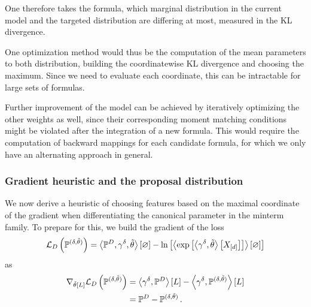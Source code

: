 

One therefore takes the formula, which marginal distribution in the current model and the targeted distribution are differing at most, measured in the KL divergence.

One optimization method would thus be the computation of the mean parameters to both distribution, building the coordinatewise KL divergence and choosing the maximum. 
Since we need to evaluate each coordinate, this can be intractable for large sets of formulas.


Further improvement of the model can be achieved by iteratively optimizing the other weights as well, since their corresponding moment matching conditions might be violated after the integration of a new formula.
This would require the computation of backward mappings for each candidate formula, for which we only have an alternating approach in general.



\subsubsection{Gradient heuristic and the proposal distribution}


We now derive a heuristic of choosing features based on the maximal coordinate of the gradient when differentiating the canonical parameter in the minterm family.
To prepare for this, we build the gradient of the loss
\begin{align*}
	\mathcal{L}_{D}\left(\mathbb{P}^{(\delta, \tilde{\theta})}\right) 
	= \left\langle \mathbb{P}^{D}, \gamma^{\delta}, \tilde{\theta}\right\rangle \left[ \varnothing \right] - \ln \left[ \left\langle \mathrm{exp}\left[\left\langle \gamma^{\delta}, \tilde{\theta}\right\rangle \left[ X_{[d]} \right]\right]\right\rangle \left[ \varnothing \right] \right] 
\end{align*}
as
\begin{align*}
	\nabla_{\tilde{\theta}\left[L\right]} \mathcal{L}_{D}\left(\mathbb{P}^{(\delta, \tilde{\theta})}\right)
	&= \left\langle \gamma^{\delta},\mathbb{P}^{D}\right\rangle \left[ L \right] - \left\langle \gamma^{\delta},\mathbb{P}^{(\delta, \tilde{\theta})}\right\rangle \left[ L \right] \\
	&= \mathbb{P}^{D} - \mathbb{P}^{(\delta, \tilde{\theta})} \, . 
\end{align*}

